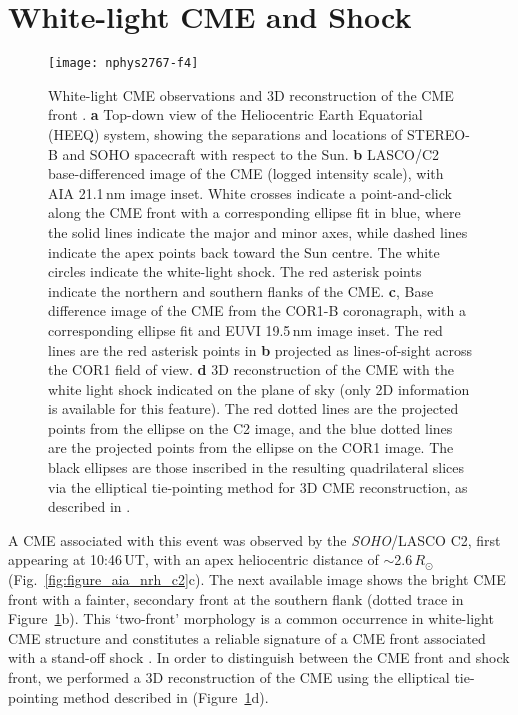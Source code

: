 \section{White-light CME and Shock}
\begin{figure}[!t]
\begin{center}
\texttt{[image: nphys2767-f4]}
\caption[3D reconstruction of CME and white-light shock]{White-light CME observations and 3D reconstruction of the CME front \citep{carley2013}. {\bf a} Top-down view of the Heliocentric Earth Equatorial (HEEQ) system, showing the separations and locations of STEREO-B and SOHO spacecraft with respect to the Sun. {\bf b} LASCO/C2 base-differenced image of the CME (logged intensity scale), with AIA 21.1\,nm image inset. White crosses indicate a point-and-click along the CME front with a corresponding ellipse fit in blue, where the solid lines indicate the major and minor axes, while dashed lines indicate the apex points back toward the Sun centre. The white circles indicate the white-light shock. The red asterisk points indicate the northern and southern flanks of the CME. {\bf c}, Base difference image of the CME from the COR1-B coronagraph, with a corresponding ellipse fit and EUVI 19.5\,nm image inset. The red lines are the red asterisk points in {\bf b} projected as lines-of-sight across the COR1 field of view. {\bf d} 3D reconstruction of the CME with the white light shock indicated on the plane of sky (only 2D information is available for this feature). The red dotted lines are the projected points from the ellipse on the C2 image, and the blue dotted lines are the projected points from the ellipse on the COR1 image. The black ellipses are those inscribed in the resulting quadrilateral slices via the elliptical tie-pointing method for 3D CME reconstruction, as described in \citep{byrne2010}.}
\label{fig:3d_cme}
\end{center}
\end{figure}
A CME associated with this event was observed by the \emph{SOHO}/LASCO C2, first appearing at 10:46\,UT, with an apex heliocentric distance of $\sim$2.6\,$R_{\odot}$ (Fig.~\ref{fig:figure_aia_nrh_c2}c). The next available image shows the bright CME front with a fainter, secondary front at the southern flank (dotted trace in Figure~\ref{fig:3d_cme}b). This `two-front' morphology is a common occurrence in white-light CME structure and constitutes a reliable signature of a CME front associated with a stand-off shock \citep{vourlidas2012}. In order to distinguish between the CME front and shock front, we performed a 3D reconstruction of the CME using the elliptical tie-pointing method described in \cite{byrne2010} (Figure~\ref{fig:3d_cme}d). 

